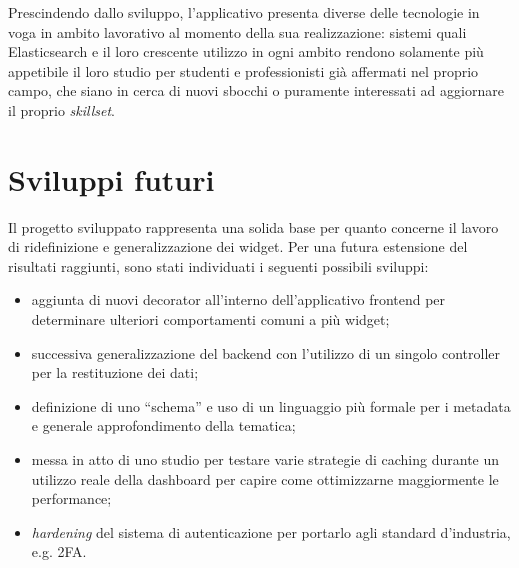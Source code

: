 Prescindendo dallo sviluppo, l'applicativo presenta diverse delle tecnologie in voga in ambito lavorativo al momento della sua realizzazione: sistemi quali Elasticsearch e il loro crescente utilizzo in ogni ambito rendono solamente più appetibile il loro studio per studenti e professionisti già affermati nel proprio campo, che siano in cerca di nuovi sbocchi o puramente interessati ad aggiornare il proprio \textit{skillset}.

 

\chapter{Sviluppi futuri}
Il progetto sviluppato rappresenta una solida base per quanto concerne il lavoro di ridefinizione e generalizzazione dei widget. Per una futura estensione del risultati raggiunti, sono stati individuati i seguenti possibili sviluppi:
\begin{itemize}
    \item aggiunta di nuovi decorator all'interno dell'applicativo frontend per determinare ulteriori comportamenti comuni a più widget;
    \item successiva generalizzazione del backend con l'utilizzo di un singolo controller per la restituzione dei dati;
    \item definizione di uno ``schema'' e uso di un linguaggio più formale per i metadata e generale approfondimento della tematica;
    \item messa in atto di uno studio per testare varie strategie di caching durante un utilizzo reale della dashboard per capire come ottimizzarne maggiormente le performance;
    \item \textit{hardening} del sistema di autenticazione per portarlo agli standard d'industria, e.g. 2FA.
\end{itemize}